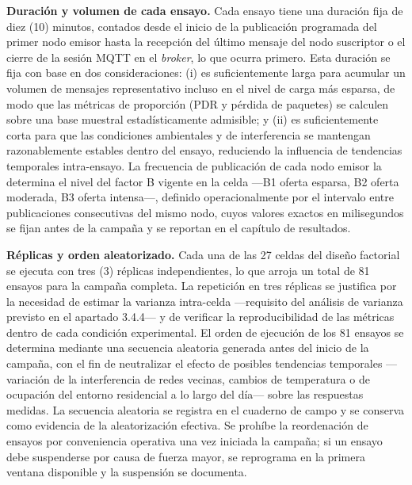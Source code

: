 \documentclass[
  12pt,
]{article}
\begin{document}
\textbf{Duración y volumen de cada ensayo.} Cada ensayo tiene una
duración fija de diez (10) minutos, contados desde el inicio de la
publicación programada del primer nodo emisor hasta la recepción del
último mensaje del nodo suscriptor o el cierre de la sesión MQTT en el
\emph{broker}, lo que ocurra primero. Esta duración se fija con base en
dos consideraciones: (i) es suficientemente larga para acumular un
volumen de mensajes representativo incluso en el nivel de carga más
esparsa, de modo que las métricas de proporción (PDR y pérdida de
paquetes) se calculen sobre una base muestral estadísticamente
admisible; y (ii) es suficientemente corta para que las condiciones
ambientales y de interferencia se mantengan razonablemente estables
dentro del ensayo, reduciendo la influencia de tendencias temporales
intra-ensayo. La frecuencia de publicación de cada nodo emisor la
determina el nivel del factor B vigente en la celda —B1 oferta esparsa,
B2 oferta moderada, B3 oferta intensa—, definido operacionalmente por el
intervalo entre publicaciones consecutivas del mismo nodo, cuyos valores
exactos en milisegundos se fijan antes de la campaña y se reportan en el
capítulo de resultados.

\textbf{Réplicas y orden aleatorizado.} Cada una de las 27 celdas del
diseño factorial se ejecuta con tres (3) réplicas independientes, lo que
arroja un total de 81 ensayos para la campaña completa. La repetición en
tres réplicas se justifica por la necesidad de estimar la varianza
intra-celda —requisito del análisis de varianza previsto en el apartado
3.4.4— y de verificar la reproducibilidad de las métricas dentro de cada
condición experimental. El orden de ejecución de los 81 ensayos se
determina mediante una secuencia aleatoria generada antes del inicio de
la campaña, con el fin de neutralizar el efecto de posibles tendencias
temporales —variación de la interferencia de redes vecinas, cambios de
temperatura o de ocupación del entorno residencial a lo largo del día—
sobre las respuestas medidas. La secuencia aleatoria se registra en el
cuaderno de campo y se conserva como evidencia de la aleatorización
efectiva. Se prohíbe la reordenación de ensayos por conveniencia
operativa una vez iniciada la campaña; si un ensayo debe suspenderse por
causa de fuerza mayor, se reprograma en la primera ventana disponible y
la suspensión se documenta.
\end{document}
